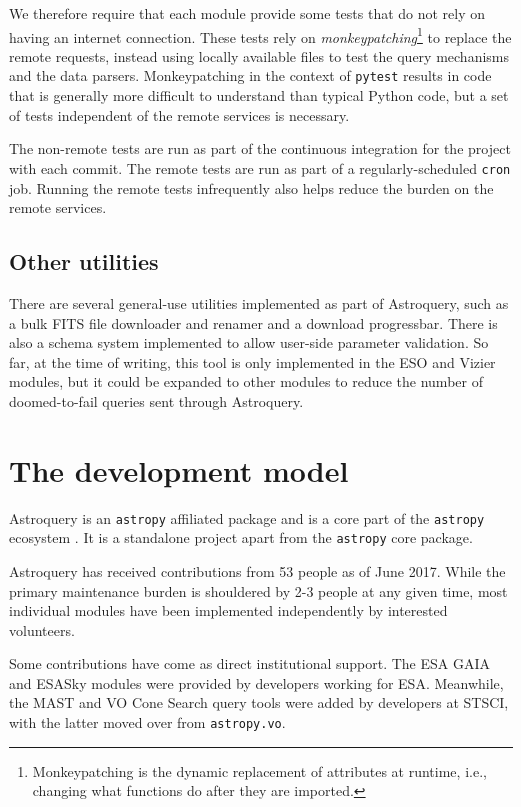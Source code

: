 \documentclass[twocolumn]{aastex61}
\begin{document}
We therefore require that each module provide some tests that do not rely on
having an internet connection.  These tests rely on
\emph{monkeypatching}\footnote{Monkeypatching is the dynamic replacement of
attributes at runtime, i.e., changing what functions do after they are
imported.} to
replace the remote requests, instead using locally available files to test the
query mechanisms and the data parsers.  Monkeypatching in the context of
\texttt{pytest} results in code that is generally more difficult to understand
than typical Python code, but a set of tests independent of the remote services
is necessary.

The non-remote tests are run as part of the continuous integration for the
project with each commit.  The remote tests are run as part of a
regularly-scheduled \texttt{cron} job.  Running the remote tests infrequently
also helps reduce the burden on the remote services.

\subsection{Other utilities}
There are several general-use utilities implemented as part of Astroquery, such
as a bulk FITS file downloader and renamer and a download progressbar.  There
is also a schema system implemented to allow user-side parameter validation.
So far, at the time of writing, this tool is only implemented in the ESO and
Vizier modules, but it could be expanded to other modules to reduce the number
of doomed-to-fail queries sent through Astroquery.

\section{The development model}
\label{sec:development}
Astroquery is an \texttt{astropy} affiliated package and is a core part of the
\texttt{astropy} ecosystem \citep{Astropy-Collaboration2013a}.  It is a
standalone project apart from the \texttt{astropy}
core package.

Astroquery has received contributions from 53 people as of June 2017.
While the primary maintenance burden is shouldered by 2-3 people at any given time,
most individual modules have been implemented independently by interested volunteers.

Some contributions have come as direct institutional support.  The ESA GAIA and
ESASky modules were provided by developers working for ESA.  Meanwhile,
the MAST and VO Cone Search query tools were added by developers at STSCI,
with the latter moved over from \texttt{astropy.vo}.
\end{document}
